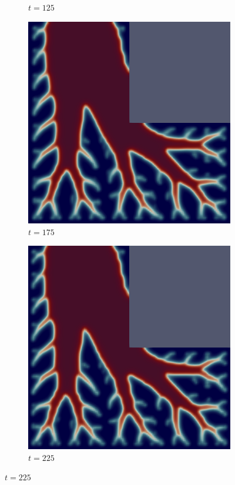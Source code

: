 \begin{figure}[H]
\begin{subfigure}{.4\textwidth}
        \caption{$t = 125$}
    \end{subfigure}
    \begin{subfigure}{.4\textwidth}
        \includegraphics[width=\textwidth]{imgs/LShape/seventh.png}
        \caption{$t = 175$}
    \end{subfigure}
    \begin{subfigure}{.4\textwidth}
        \includegraphics[width=\textwidth]{imgs/LShape/eighth.png}
        \caption{$t = 225$}
    \end{subfigure}
\end{figure}

